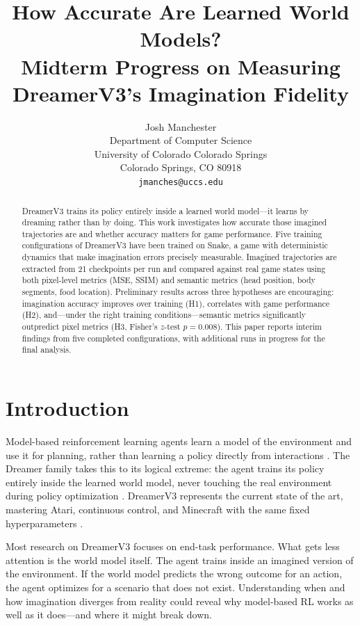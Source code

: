 \documentclass[letterpaper]{article}
\title{How Accurate Are Learned World Models? \\Midterm Progress on Measuring DreamerV3's Imagination Fidelity}
\author{
    Josh Manchester\\
    Department of Computer Science\\
    University of Colorado Colorado Springs\\
    Colorado Springs, CO 80918\\
    \texttt{jmanches@uccs.edu}
}
\begin{document}
\maketitle

\begin{abstract}
DreamerV3 trains its policy entirely inside a learned world model---it learns by dreaming rather than by doing. This work investigates how accurate those imagined trajectories are and whether accuracy matters for game performance. Five training configurations of DreamerV3 have been trained on Snake, a game with deterministic dynamics that make imagination errors precisely measurable. Imagined trajectories are extracted from 21 checkpoints per run and compared against real game states using both pixel-level metrics (MSE, SSIM) and semantic metrics (head position, body segments, food location). Preliminary results across three hypotheses are encouraging: imagination accuracy improves over training (H1), correlates with game performance (H2), and---under the right training conditions---semantic metrics significantly outpredict pixel metrics (H3, Fisher's $z$-test $p = 0.008$). This paper reports interim findings from five completed configurations, with additional runs in progress for the final analysis.
\end{abstract}

\section{Introduction}

Model-based reinforcement learning agents learn a model of the environment and use it for planning, rather than learning a policy directly from interactions \citep{sutton2018rl}. The Dreamer family takes this to its logical extreme: the agent trains its policy entirely inside the learned world model, never touching the real environment during policy optimization \citep{hafner2020dreamerv1, hafner2021dreamerv2, hafner2025dreamerv3}. DreamerV3 represents the current state of the art, mastering Atari, continuous control, and Minecraft with the same fixed hyperparameters \citep{hafner2025dreamerv3}.

Most research on DreamerV3 focuses on end-task performance. What gets less attention is the world model itself. The agent trains inside an imagined version of the environment. If the world model predicts the wrong outcome for an action, the agent optimizes for a scenario that does not exist. Understanding when and how imagination diverges from reality could reveal why model-based RL works as well as it does---and where it might break down.
\end{document}

